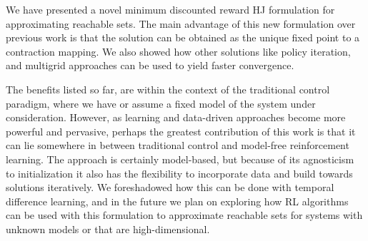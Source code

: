 
We have presented a novel minimum discounted reward HJ formulation for approximating reachable sets. The main advantage of this new formulation over previous work is that the solution can be obtained as the unique fixed point to a contraction mapping. We also showed how other solutions like policy iteration, and multigrid approaches can be used to yield faster convergence. 

The benefits listed so far, are  within the context of the traditional control paradigm, where we have or assume a fixed model of the system under consideration. However, as learning and data-driven approaches become more powerful and pervasive, perhaps the greatest contribution of this work is that it can lie somewhere in between traditional control and model-free reinforcement learning. The approach is certainly model-based, but because of its agnosticism to initialization it also has the flexibility to incorporate data and build towards solutions iteratively. We foreshadowed how this can be done with temporal difference learning, and in the future we plan on exploring how RL algorithms can be used with this formulation to approximate reachable sets for systems with unknown models or that are high-dimensional. 